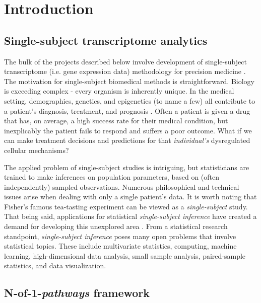 \chapter{Introduction}\label{Chap:Intro}

\section{Single-subject transcriptome analytics}\label{sec:nof1}

\indent \indent The bulk of the projects described below involve development of single-subject transcriptome (i.e. gene expression data) methodology for precision medicine \citep{Hamburg2010}. The motivation for single-subject biomedical methods is straightforward. Biology is exceeding complex - every organism is inherently unique. In the medical setting, demographics, genetics, and epigenetics (to name a few) all contribute to a patient's diagnosis, treatment, and prognosis \citep{Kern2012}. Often a patient is given a drug that has, on average, a high success rate for their medical condition, but inexplicably the patient fails to respond and suffers a poor outcome. What if we can make treatment decisions and predictions for that \emph{individual's} dysregulated cellular mechanisms? 

The applied problem of single-subject studies is intriguing, but statisticians are trained to make inferences on population parameters, based on (often independently) sampled observations. Numerous philosophical and technical issues arise when dealing with only a single patient's data. It is worth noting that Fisher's famous tea-tasting experiment \citep{Fisher1935} can be viewed as a \emph{single-subject} study. That being said, applications for statistical \emph{single-subject inference} have created a demand for developing this unexplored area \citep{Bacchetti2011}. From a statistical research standpoint, \emph{single-subject inference} poses many open problems that involve statistical topics. These include multivariate statistics, computing, machine learning, high-dimensional data analysis, small sample analysis, paired-sample statistics, and data visualization.

\section{N-of-1-\emph{pathways} framework}\label{sec:nof1pathways}


